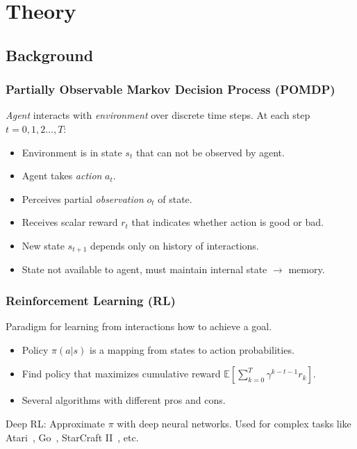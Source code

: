 \section{Theory}

\subsection{Background}

\begin{frame}
    \frametitle{Partially Observable Markov Decision Process (POMDP)}

    \textit{Agent} interacts with \textit{environment} over discrete time steps. At each step \(t = 0, 1, 2\dots, T\):

    \begin{itemize}
        \item Environment is in state \(s_t\) that can not be observed by agent.
        \item Agent takes \textit{action} \(a_t\).
        \item Perceives partial \textit{observation} \(o_t\) of state.
        \item Receives scalar reward \(r_t\) that indicates whether action is good or bad.
        \item New state \(s_{t+1}\) depends only on history of interactions.
        \item State not available to agent, must maintain internal state \(\rightarrow\) memory.
    \end{itemize}

    \begin{figure}
        \centering
        \scalebox{0.75}{}
    \end{figure}
\end{frame}

\begin{frame}
    \frametitle{Reinforcement Learning (RL)}

    Paradigm for learning from interactions how to achieve a goal.

    \begin{itemize}
        \item Policy \(\pi(a|s)\) is a mapping from states to action probabilities.
        \item Find policy that maximizes cumulative reward \(\mathbb{E} \left\lbrack \sum_{k=0}^{T} \gamma^{k-t-1} r_k \right\rbrack\).
        \item Several algorithms with different pros and cons.
    \end{itemize}

    Deep RL: Approximate \(\pi\) with deep neural networks. Used for complex tasks like Atari~\cite{mnih_human-level_2015}, Go~\cite{silver_mastering_2016}, StarCraft II~\cite{vinyals_grandmaster_2019}, etc.
\end{frame}

